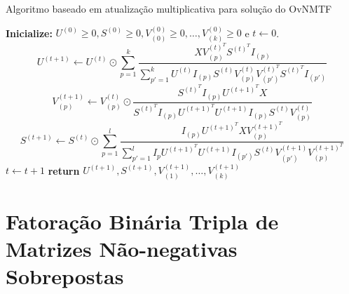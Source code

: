 \documentclass[
    12pt,                %
    oneside,            %
    a4paper,            %
    english,            %
    brazil                %
    ]{abntex2ppgsi}
\begin{document}
\begin{algorithm}
\caption{Algoritmo baseado em atualização multiplicativa para solução do OvNMTF}
\label{algo:ovnmtf}
    \begin{algorithmic}[1]
            \State \textbf{Inicialize:} $U^{(0)} \geq 0, S^{(0)} \geq 0, V_{(0)}^{(0)} \geq 0, \dots, V_{(k)}^{(0)} \geq 0$ e $t \gets 0$.
                \State
                    \begin{equation}
                    \label{eq:ovnmtf:updateU}
                        U^{(t+1)} \gets U^{(t)} \odot \sum_{p=1}^{k} \frac{ X V^{(t)^T}_{(p)} S^{(t)^T} I_{(p)} }{ \sum_{p'=1}^k U^{(t)} I_{(p)} S^{(t)} V^{(t)}_{(p)} V^{(t)^T}_{(p')} S^{(t)^T} I_{(p')} }
                    \end{equation}
                    \State
                        \begin{equation}
                        \label{eq:ovnmtf:updateV}
                            V^{(t+1)}_{(p)} \gets V^{(t)}_{(p)} \odot \frac{ S^{(t)^T} I_{(p)} U^{(t+1)^T} X }{ S^{(t)^T} I_{(p)} U^{(t+1)^T} U^{(t+1)} I_{(p)} S^{(t)} V^{(t)}_{(p)} }
                        \end{equation}
                \EndFor
                \State
                    \begin{equation}
                    \label{eq:ovnmtf:updateS}
                        S^{(t+1)} \gets S^{(t)} \odot \sum_{p=1}^{l} \frac{ I_{(p)} U^{(t+1)^T} X V^{(t+1)^T}_{(p)} }{ \sum_{p'=1}^{l} I_{p} U^{(t+1)^T} U^{(t+1)} I_{(p')} S^{(t)} V^{(t+1)}_{(p')} V^{(t+1)^T}_{(p)} }
                    \end{equation}
                \State $t \gets t + 1$
            \EndWhile\label{euclidendwhile}
            \State \textbf{return} $U^{(t+1)}, S^{(t+1)}, V_{(1)}^{(t+1)}, \dots, V_{(k)}^{(t+1)}$
        \EndFunction
    \end{algorithmic}
\end{algorithm}


\section{Fatoração Binária Tripla de Matrizes Não-negativas Sobrepostas}
\end{document}

